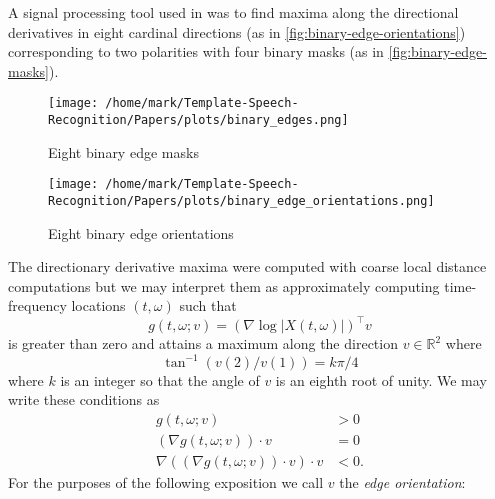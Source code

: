 \documentclass[english]{article}
\begin{document}
A signal processing tool used in \cite{amitobject,stoehrmasters} was to find maxima
along the directional derivatives in eight cardinal directions (as in \autoref{fig:binary-edge-orientations}) corresponding to two polarities
with four binary masks (as in \autoref{fig:binary-edge-masks}).
\begin{figure}
  \centering
  \texttt{[image: /home/mark/Template-Speech-Recognition/Papers/plots/binary\_edges.png]}
  \caption{Eight binary edge masks}\label{fig:binary-edge-masks}
 \end{figure}
\begin{figure}
  \centering
  \texttt{[image: /home/mark/Template-Speech-Recognition/Papers/plots/binary\_edge\_orientations.png]}
  \caption{Eight binary edge orientations}\label{fig:binary-edge-orientations}
\end{figure}
The directionary derivative maxima were computed with coarse local distance computations but we may interpret
them as approximately computing time-frequency locations $(t,\omega)$ such that
\begin{equation}\label{eq:directional-derivative-defn}
g(t,\omega; v) =(\nabla \log |X(t,\omega)| )^\top v
\end{equation}
is greater than zero
and attains a maximum along the direction $v\in\mathbb{R}^2$ where \begin{equation}\tan^{-1}(v(2)/v(1)) = k\pi/4\end{equation}
where $k$ is an integer so that the angle of $v$ is an eighth root of unity. We may write these conditions as
\begin{align}\label{align:edge-conditions1}
g(t,\omega; v) &> 0\\
\label{align:edge-conditions2}(\nabla g(t,\omega; v))\cdot v &= 0\\
\label{align:edge-conditions3}\nabla ((\nabla g(t,\omega; v))\cdot v) \cdot v &< 0.
\end{align}
For the purposes of the following exposition we call $v$ the \textit{edge orientation}:
\end{document}
